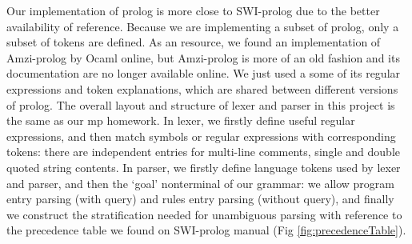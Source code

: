 Our implementation of prolog is more close to SWI-prolog due to the better availability of reference. Because we are implementing a subset of prolog, only a subset of tokens are defined. As an resource, we found an implementation of Amzi-prolog by Ocaml online\cite{gitcode}, but Amzi-prolog is more of an old fashion and its documentation are no longer available online. We just used a some of its regular expressions and token explanations, which are shared between different versions of prolog.
The overall layout and structure of lexer and parser in this project is the same as our mp homework. In lexer, we firstly define useful regular expressions, and then match symbols or regular expressions with corresponding tokens: there are independent entries for multi-line comments, single and double quoted string contents. In parser, we firstly define language tokens used by lexer and parser, and then the `goal' nonterminal of our grammar: we allow program entry parsing (with query) and rules entry parsing (without query), and finally we construct the stratification needed for unambiguous parsing with reference to the precedence table we found on SWI-prolog manual (Fig \ref{fig:precedenceTable}).

